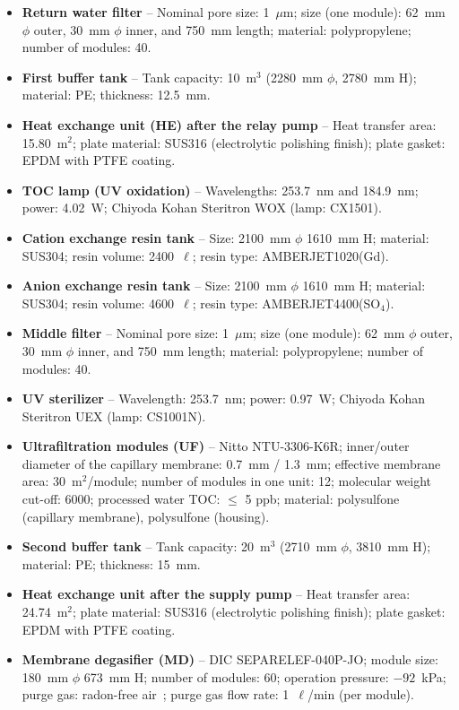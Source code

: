 \documentclass[preprint,12pt]{elsarticle}
\begin{document}
\begin{itemize}
    \item {\bf Return water filter} -- Nominal pore size: 1~$\mu$m; size (one module): 62~mm $\phi$ outer, 30~mm $\phi$ inner, and 750~mm length;  material: polypropylene;  number of modules: 40.
    \item {\bf First buffer tank} -- Tank capacity: 10~m$^3$ (2280~mm $\phi$, 2780~mm H); material: PE; thickness: 12.5~mm.
    \item {\bf Heat exchange unit (HE) after the relay pump} -- Heat transfer area: 15.80~m$^2$; plate material: SUS316 (electrolytic polishing finish); plate gasket: EPDM with PTFE coating.
    \item {\bf TOC lamp (UV oxidation)} -- Wavelengths: 253.7~nm and 184.9~nm; power: 4.02~W; Chiyoda Kohan Steritron WOX (lamp: CX1501).
    \item {\bf Cation exchange resin tank} -- Size: 2100~mm $\phi$ 1610~mm H; material: SUS304; resin volume: 2400~$\ell$; resin type: AMBERJET1020(Gd).
    \item {\bf Anion exchange resin tank} -- Size: 2100~mm $\phi$ 1610~mm H; material: SUS304; resin volume: 4600~$\ell$; resin type: AMBERJET4400(SO$_4$). 
    \item {\bf Middle filter} -- Nominal pore size: 1~$\mu$m; size (one module): 62~mm $\phi$ outer, 30~mm $\phi$ inner, and 750~mm length;  material: polypropylene; number of modules: 40.
    \item {\bf UV sterilizer} --  Wavelength: 253.7~nm; power: 0.97~W; Chiyoda Kohan Steritron UEX (lamp: CS1001N).
    \item {\bf Ultrafiltration modules (UF)} -- Nitto NTU-3306-K6R;  inner/outer diameter of the capillary membrane:  0.7~mm / 1.3~mm; effective membrane area: 30~m$^2$/module; number of modules in one unit: 12; molecular weight cut-off: 6000; processed water TOC: $\leq$ 5 ppb; material:  polysulfone (capillary membrane), polysulfone (housing).
    \item {\bf Second buffer tank} -- Tank capacity: 20~m$^3$ (2710~mm $\phi$, 3810~mm H); material: PE; thickness: 15~mm.
    \item {\bf Heat exchange unit after the supply pump} -- Heat transfer area: 24.74~m$^2$; plate material: SUS316 (electrolytic polishing finish); plate gasket:  EPDM with PTFE coating.
    \item {\bf Membrane degasifier (MD)} -- DIC SEPAREL\textregistered EF-040P-JO; module size: 180~mm $\phi$ 673~mm H; number of modules: 60; operation pressure: $-92$~kPa; purge gas: radon-free air~\cite{Fukuda:2003skdet, Nakano:2017rsy}; purge gas flow rate: 1~$\ell$/min (per module).

\end{itemize}
\end{document}
